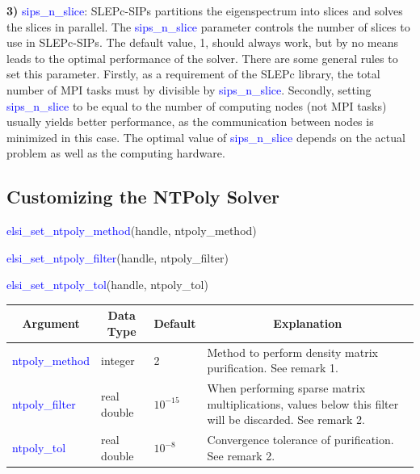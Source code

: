 \documentclass{report}
\begin{document}
\textbf{3)} \textcolor{blue}{sips\_n\_slice}:  SLEPc-SIPs partitions the eigenspectrum into slices and solves the slices in parallel.  The \textcolor{blue}{sips\_n\_slice} parameter controls the number of slices to use in SLEPc-SIPs.  The default value, 1, should always work, but by no means leads to the optimal performance of the solver.  There are some general rules to set this parameter.  Firstly, as a requirement of the SLEPc library, the total number of MPI tasks must by divisible by \textcolor{blue}{sips\_n\_slice}.  Secondly, setting \textcolor{blue}{sips\_n\_slice} to be equal to the number of computing nodes (not MPI tasks) usually yields better performance, as the communication between nodes is minimized in this case.  The optimal value of \textcolor{blue}{sips\_n\_slice} depends on the actual problem as well as the computing hardware.

\subsection{Customizing the NTPoly Solver}
\label{subsec:setter_ntpoly}
\begin{labeling}{\hspace{6cm}}
\item [\hspace{0.3cm} \textcolor{blue}{elsi\_set\_ntpoly\_method}(handle, ntpoly\_method)]
\item [\hspace{0.3cm} \textcolor{blue}{elsi\_set\_ntpoly\_filter}(handle, ntpoly\_filter)]
\item [\hspace{0.3cm} \textcolor{blue}{elsi\_set\_ntpoly\_tol}(handle, ntpoly\_tol)]
\end{labeling}

\begin{tabular}[]{|p{30mm}|p{20mm}|p{15mm}|p{100mm}|}
\hline
\multicolumn{1}{|c|}{\textbf{Argument}} & \multicolumn{1}{c|}{\textbf{Data Type}} & \multicolumn{1}{c|}{\textbf{Default}} & \multicolumn{1}{c|}{\textbf{Explanation}}\\
\hline
\textcolor{blue}{ntpoly\_method} & integer     & 2          & Method to perform density matrix purification.  See remark 1.\\
\hline
\textcolor{blue}{ntpoly\_filter} & real double & $10^{-15}$ & When performing sparse matrix multiplications, values below this filter will be discarded.  See remark 2.\\
\hline
\textcolor{blue}{ntpoly\_tol}    & real double & $10^{-8}$  & Convergence tolerance of purification.  See remark 2.\\
\hline
\end{tabular}
\end{document}
